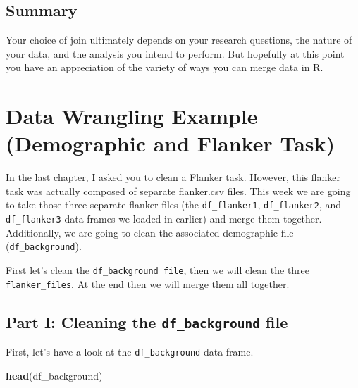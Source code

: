 \documentclass[
]{book}
\newenvironment{Shaded}{\begin{snugshade}}{\end{snugshade}}
\newcommand{\FunctionTok}[1]{\textcolor[rgb]{0.13,0.29,0.53}{\textbf{#1}}}
\newcommand{\NormalTok}[1]{#1}
\begin{document}
\subsection{Summary}\label{summary-7}

Your choice of join ultimately depends on your research questions, the nature of your data, and the analysis you intend to perform. But hopefully at this point you have an appreciation of the variety of ways you can merge data in R.

\section{Data Wrangling Example (Demographic and Flanker Task)}\label{data-wrangling-example-demographic-and-flanker-task}

\hyperref[clean-activity]{In the last chapter, I asked you to clean a Flanker task}. However, this flanker task was actually composed of separate flanker.csv files. This week we are going to take those three separate flanker files (the \texttt{df\_flanker1}, \texttt{df\_flanker2}, and \texttt{df\_flanker3} data frames we loaded in earlier) and merge them together. Additionally, we are going to clean the associated demographic file (\texttt{df\_background}).

First let's clean the \texttt{df\_background\ file}, then we will clean the three \texttt{flanker\_files}. At the end then we will merge them all together.

\subsection{\texorpdfstring{Part I: Cleaning the \texttt{df\_background} file}{Part I: Cleaning the df\_background file}}\label{part-i-cleaning-the-df_background-file}

First, let's have a look at the \texttt{df\_background} data frame.

\begin{Shaded}
\begin{Highlighting}[]
\FunctionTok{head}\NormalTok{(df\_background)}
\end{Highlighting}
\end{Shaded}
\end{document}
